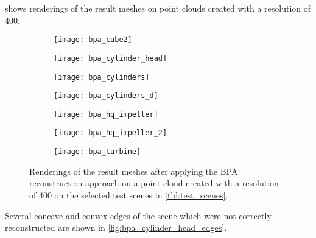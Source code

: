  shows renderings of the result meshes on point clouds created with a resolution of 400.

\begin{figure}
	\centering
	\begin{subfigure}[b]{0.34\textwidth}
		\centering
		\texttt{[image: bpa\_cube2]}
		\caption{\cubes}
		\label{fig:bpa_cube2}
	\end{subfigure}
	\hspace{1cm}
	\begin{subfigure}[b]{0.34\textwidth}
		\centering
		\texttt{[image: bpa\_cylinder\_head]}
		\caption{\cylinderhead}
		\label{fig:bpa_cylinder_head}
	\end{subfigure}
	\begin{subfigure}[b]{0.34\textwidth}
		\centering
		\texttt{[image: bpa\_cylinders]}
		\caption{\cylinders}
		\label{fig:bpa_cylinders}
	\end{subfigure}
	\hspace{1cm}
	\begin{subfigure}[b]{0.34\textwidth}
		\centering
		\texttt{[image: bpa\_cylinders\_d]}
		\caption{\cylindersd}
		\label{fig:bpa_cylinders_d}
	\end{subfigure}
	\begin{subfigure}[b]{0.34\textwidth}
		\centering
		\texttt{[image: bpa\_hq\_impeller]}
		\caption{\impeller}
		\label{fig:bpa_hq_impeller}
	\end{subfigure}
	\hspace{1cm}
	\begin{subfigure}[b]{0.34\textwidth}
		\centering
		\texttt{[image: bpa\_hq\_impeller\_2]}
		\caption{\impellerhalf}
		\label{fig:bpa_hq_impeller_2}
	\end{subfigure}
	\begin{subfigure}[b]{0.33\textwidth}
		\centering
		\texttt{[image: bpa\_turbine]}
		\caption{\turbine}
		\label{fig:bpa_turbine}
	\end{subfigure}
	\caption[BPA result renderings]{
		Renderings of the result meshes after applying the BPA reconstruction approach on a point cloud created with a resolution of 400 on the selected test scenes in \cref{tbl:test_scenes}.
	}
	\label{fig:bpa_results}
\end{figure}

Several concave and convex edges of the \cylinderhead scene which were not correctly reconstructed are shown in \cref{fig:bpa_cylinder_head_edges}.

